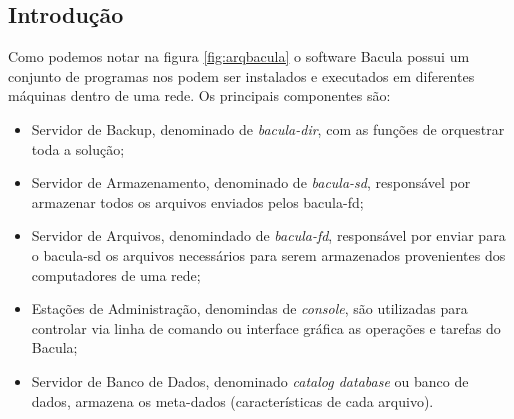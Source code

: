 \subsection{Introdução}
Como podemos notar na figura \ref{fig:arqbacula} o software Bacula possui um conjunto de programas nos podem ser instalados e executados em diferentes máquinas dentro de uma rede.
Os principais componentes são:
\begin{itemize}
\item Servidor de Backup, denominado de \textit{bacula-dir}, com as funções de orquestrar toda a solução;
\item Servidor de Armazenamento, denominado de \textit{bacula-sd}, responsável por armazenar todos os arquivos enviados pelos bacula-fd;
\item Servidor de Arquivos, denomindado de \textit{bacula-fd}, responsável por enviar para o bacula-sd os arquivos necessários para serem armazenados provenientes dos computadores de uma rede;
\item Estações de Administração, denomindas de \textit{console}, são utilizadas para controlar via linha de comando ou interface gráfica as operações e tarefas do Bacula;
\item Servidor de Banco de Dados, denominado \textit{catalog database} ou banco de dados, armazena os meta-dados (características de cada arquivo).
\end{itemize}

